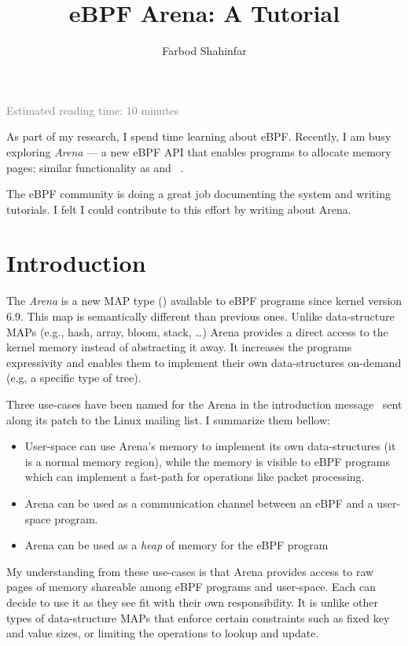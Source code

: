 \documentclass{article}
\title{eBPF Arena: A Tutorial}
\author{Farbod Shahinfar}
\begin{document}
\maketitle
{
    \small \textcolor{gray}{Estimated reading time: 10 minutes}
}



As part of my research, I spend time learning about eBPF.
Recently, I am busy exploring \emph{Arena} --- a new eBPF API that enables
programs to allocate memory pages; similar functionality as  and
~\cite{arenapatch}.

The eBPF community is doing a great job documenting the system and writing
tutorials. I felt I could contribute to this effort by writing about Arena.


\section{Introduction}

The \emph{Arena} is a new MAP type () available to eBPF programs
since kernel version 6.9.
This map is semantically different than previous ones.
Unlike data-structure MAPs (e.g., hash, array, bloom, stack, \dots{}) Arena
provides a direct access to the kernel memory instead of abstracting it away.
It increases the programs expressivity and enables them to implement their own
data-structures on-demand (e.g, a specific type of tree).

Three use-cases have been named for the Arena in the introduction
message~\cite{arenapatch} sent along its patch to the Linux mailing list. I
summarize them bellow:
\begin{itemize}
    \item User-space can use Arena's memory to implement its own
        data-structures (it is a normal memory region), while the memory is
        visible to eBPF programs which can implement a fast-path for operations
        like packet processing.
    \item Arena can be used as a communication channel between an eBPF and a
        user-space program.
    \item Arena can be used as a \emph{heap} of memory for the eBPF program
\end{itemize}
My understanding from these use-cases is that Arena provides access to raw
pages of memory shareable among eBPF programs and user-space. Each can decide
to use it as they see fit with their own responsibility. It is unlike other
types of data-structure MAPs that enforce certain constraints such as fixed key
and value sizes, or limiting the operations to lookup and update.
\end{document}
